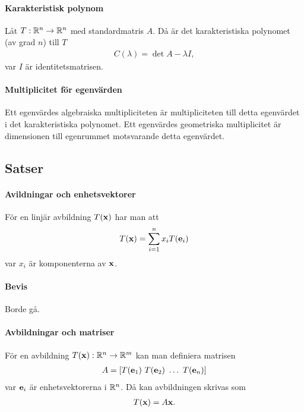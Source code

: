 \paragraph{Karakteristisk polynom}
Låt $T: \mathbb{R}^n\to\mathbb{R}^n$ med standardmatris $A$. Då är det karakteristiska polynomet (av grad $n$) till $T$
\begin{align*}
	C(\lambda) = \det{A - \lambda I},
\end{align*}
var $I$ är identitetsmatrisen.

\paragraph{Multiplicitet för egenvärden}
Ett egenvärdes algebraiska multipliciteten är multipliciteten till detta egenvärdet i det karakteristiska polynomet. Ett egenvärdes geometriska multiplicitet är dimensionen till egenrummet motsvarande detta egenvärdet.

\subsection{Satser}

\paragraph{Avildningar och enhetsvektorer}
För en linjär avbildning $T(\vect{x})$ har man att
\begin{align*}
	T(\vect{x}) = \sum\limits_{i = 1}^{n} x_iT(\vect{e}_i)
\end{align*}
var $x_i$ är komponenterna av $\vect{x}$.

\paragraph{Bevis}
Borde gå.

\paragraph{Avbildningar och matriser}
För en avbildning $T(\vect{x}): \R^n\to\R^m$ kan man definiera matrisen
\begin{align*}
	A = \left[ T(\vect{e}_1) ~ T(\vect{e}_2) ~ \dots ~ T(\vect{e}_n) \right]
\end{align*}
var $\vect{e}_i$ är enhetsvektorerna i $\mathbb{R}^n$. Då kan avbildningen skrivas som
\begin{align*}
	T(\vect{x}) = A\vect{x}.
\end{align*}

